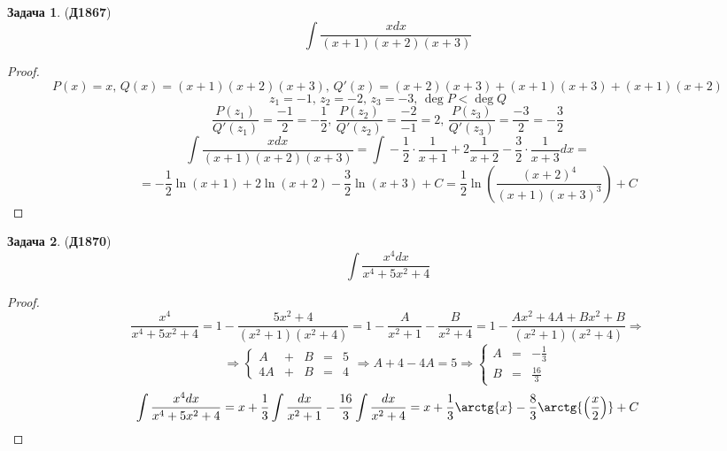 \documentclass[12pt]{article}
\theoremstyle{definition}
\newtheorem{problem}{Задача}
\DeclareMathOperator{\dint}{\displaystyle\int}
\begin{document}
\begin{problem}(\textbf{Д1867})
	$$
		\dint \dfrac{xdx}{(x + 1)(x+2)(x+3)}
	$$
\end{problem}
\begin{proof}
	$$
		P(x) = x, \, Q(x) = (x + 1)(x+2)(x+3), \, Q'(x) = (x+ 2)(x+ 3) + (x+ 1)(x+ 3) + (x+1)(x+2)
	$$
	$$
		z_1 = -1,\, z_2 = -2, \, z_3 = -3, \, \deg{P} < \deg{Q} 
	$$
	$$
		\dfrac{P(z_1)}{Q'(z_1)} = \dfrac{-1}{2} = -\dfrac{1}{2}, \, \dfrac{P(z_2)}{Q'(z_2)} = \dfrac{-2}{-1} = 2, \, \dfrac{P(z_3)}{Q'(z_3)} = \dfrac{-3}{2} = - \dfrac{3}{2} 
	$$
	$$
		\dint \dfrac{xdx}{(x + 1)(x+2)(x+3)} = \dint -\dfrac{1}{2}{\cdot}\dfrac{1}{x+1} + 2\dfrac{1}{x + 2} - \dfrac{3}{2}{\cdot}\dfrac{1}{x + 3}dx = 
	$$
	$$
		= -\dfrac{1}{2}\ln{(x+1)} + 2\ln{(x + 2)} - \dfrac{3}{2}\ln{(x + 3)} + C = \dfrac{1}{2}\ln{\left(\dfrac{(x+2)^4}{(x+1)(x+3)^3}\right)} + C
	$$
\end{proof}
\begin{problem}(\textbf{Д1870})
	$$
		\dint \dfrac{x^4dx}{x^4 + 5x^2 + 4}
	$$
\end{problem}
\begin{proof}
	$$
		\dfrac{x^4}{x^4 + 5x^2 + 4} = 1 - \dfrac{5x^2 + 4}{(x^2 + 1)(x^2 + 4)} = 1 - \dfrac{A}{x^2 + 1} - \dfrac{B}{x^2 + 4} = 1 - \dfrac{Ax^2 + 4A + Bx^2 + B}{(x^2 + 1)(x^2 + 4)} \Rightarrow
	$$
	$$
		\Rightarrow 
		\left\{
		\begin{matrix}
			A &+& B & = & 5\\
			4A &+& B & = & 4
		\end{matrix}
		\right.
		\Rightarrow  A + 4 - 4A = 5 \Rightarrow 
		\left\{
			\begin{matrix}
				A &=& -\tfrac{1}{3}\\[5pt]
				B &=& \tfrac{16}{3}
			\end{matrix}
		\right.
	$$	
	$$
		\dint \dfrac{x^4dx}{x^4 + 5x^2 + 4} = x + \dfrac{1}{3}\dint \dfrac{dx}{x^2 + 1} - \dfrac{16}{3}\dint \dfrac{dx}{x^2 + 4} = x + \dfrac{1}{3}\arctg{x} - \dfrac{8}{3}\arctg{\left(\dfrac{x}{2}\right)} + C
	$$
\end{proof}
\end{document}
